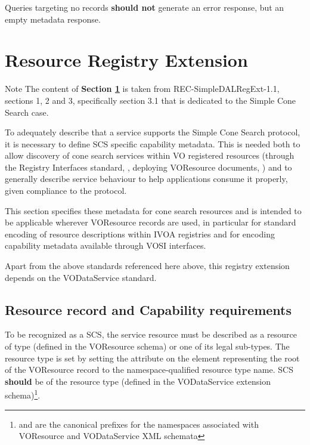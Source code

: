 \documentclass[11pt,a4paper]{ivoa}
\begin{document}
Queries targeting no records \textbf{should not} generate an error response, but an empty metadata response.

\section{Resource Registry Extension}
\label{sec:regext}

\begin{admonition}{Note}
The content of \textbf{Section \ref{sec:regext}} is taken from REC-SimpleDALRegExt-1.1, sections 1, 2 and 3, specifically section 3.1 that is dedicated to the Simple Cone Search case.
\end{admonition}

To adequately describe that a service supports the Simple Cone Search protocol, it is necessary to define SCS specific capability metadata. This is needed both to allow discovery of cone search services within VO registered resources (through the Registry Interfaces standard, \citet{std:RI1}, deploying VOResource documents, \citet{std:VOR}) and to generally describe service behaviour to help applications consume it properly, given compliance to the protocol.

This section specifies these metadata for cone search resources and is intended to be applicable wherever VOResource records are used, in particular for standard encoding of resource descriptions within IVOA registries and for encoding capability metadata available through VOSI \citep{std:VOSI11} interfaces.

Apart from the above standards referenced here above, this registry extension depends on the VODataService \citep{std:VODS11} standard.

\subsection{Resource record and Capability requirements}
To be recognized as a SCS, the service resource must be described as a resource of type  (defined in the VOResource schema) or one of its legal sub-types. The resource type is set by setting the  attribute on the element representing the root of the VOResource record to the namespace-qualified resource type name. SCS \textbf{should} be of the resource type  (defined in the VODataService extension schema)\footnote{ and  are the canonical prefixes for the namespaces associated with VOResource and VODataService XML schemata}. 
\end{document}
